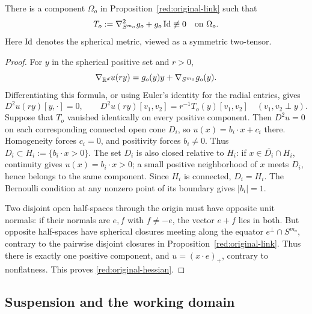 \begin{lemma}\label{red:nonflat-component}
There is a component $\Omega_o$ in Proposition~\ref{red:original-link}
such that
\begin{equation}\label{red:original-hessian}
 T_o:=\nabla^2_{S^{m_o}}g_o+g_o\operatorname{Id}\not\equiv0
 \quad\hbox{on }\Omega_o.
\end{equation}
Here $\operatorname{Id}$ denotes the spherical metric, viewed as a symmetric two-tensor.
\end{lemma}

\begin{proof}
For $y$ in the spherical positive set and $r>0$,
\[
 \nabla_{\mathbb R^d}u(ry)=g_o(y)y+\nabla_{S^{m_o}}g_o(y).
\]
Differentiating this formula, or using Euler's identity for the radial
entries, gives
\begin{equation}\label{red:ambient-hessian}
 D^2u(ry)[y,\cdot]=0,
 \qquad
 D^2u(ry)[v_1,v_2]=r^{-1}T_o(y)[v_1,v_2]
 \quad(v_1,v_2\perp y).
\end{equation}
Suppose that $T_o$ vanished identically on every positive component.  Then
$D^2u=0$ on each corresponding connected open cone $D_i$, so
$u(x)=b_i\cdot x+c_i$ there.  Homogeneity forces $c_i=0$, and positivity
forces $b_i\ne0$.  Thus $D_i\subset H_i:=\{b_i\cdot x>0\}$.
The set $D_i$ is also closed relative to $H_i$: if
$x\in\overline{D_i}\cap H_i$, continuity gives $u(x)=b_i\cdot x>0$;
a small positive neighborhood of $x$ meets $D_i$, hence belongs to the
same component.  Since $H_i$ is connected, $D_i=H_i$.
The Bernoulli condition at any nonzero point of its boundary gives
$|b_i|=1$.

Two disjoint open half-spaces through the origin must have opposite unit
normals: if their normals are $e,f$ with $f\ne-e$, the vector $e+f$ lies
in both. But opposite half-spaces have spherical closures meeting along
the equator $e^\perp\cap S^{m_o}$, contrary to the pairwise disjoint
closures in Proposition~\ref{red:original-link}. Thus there is exactly
one positive component, and $u=(x\cdot e)_+$, contrary to nonflatness.
This proves \eqref{red:original-hessian}.
\end{proof}

\subsection{Suspension and the working domain}\label{red:suspension-subsection}

